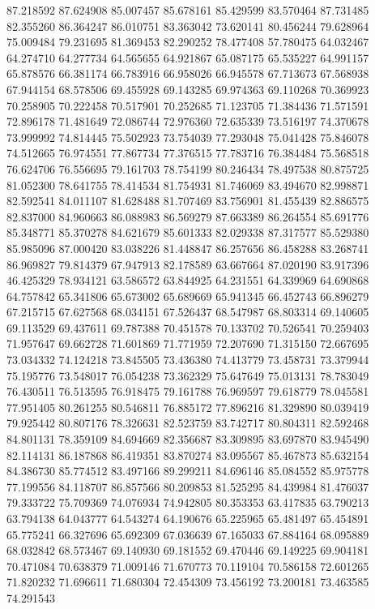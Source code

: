 87.218592
87.624908
85.007457
85.678161
85.429599
83.570464
87.731485
82.355260
86.364247
86.010751
83.363042
73.620141
80.456244
79.628964
75.009484
79.231695
81.369453
82.290252
78.477408
57.780475
64.032467
64.274710
64.277734
64.565655
64.921867
65.087175
65.535227
64.991157
65.878576
66.381174
66.783916
66.958026
66.945578
67.713673
67.568938
67.944154
68.578506
69.455928
69.143285
69.974363
69.110268
70.369923
70.258905
70.222458
70.517901
70.252685
71.123705
71.384436
71.571591
72.896178
71.481649
72.086744
72.976360
72.635339
73.516197
74.370678
73.999992
74.814445
75.502923
73.754039
77.293048
75.041428
75.846078
74.512665
76.974551
77.867734
77.376515
77.783716
76.384484
75.568518
76.624706
76.556695
79.161703
78.754199
80.246434
78.497538
80.875725
81.052300
78.641755
78.414534
81.754931
81.746069
83.494670
82.998871
82.592541
84.011107
81.628488
81.707469
83.756901
81.455439
82.886575
82.837000
84.960663
86.088983
86.569279
87.663389
86.264554
85.691776
85.348771
85.370278
84.621679
85.601333
82.029338
87.317577
85.529380
85.985096
87.000420
83.038226
81.448847
86.257656
86.458288
83.268741
86.969827
79.814379
67.947913
82.178589
63.667664
87.020190
83.917396
46.425329
78.934121
63.586572
63.844925
64.231551
64.339969
64.690868
64.757842
65.341806
65.673002
65.689669
65.941345
66.452743
66.896279
67.215715
67.627568
68.034151
67.526437
68.547987
68.803314
69.140605
69.113529
69.437611
69.787388
70.451578
70.133702
70.526541
70.259403
71.957647
69.662728
71.601869
71.771959
72.207690
71.315150
72.667695
73.034332
74.124218
73.845505
73.436380
74.413779
73.458731
73.379944
75.195776
73.548017
76.054238
73.362329
75.647649
75.013131
78.783049
76.430511
76.513595
76.918475
79.161788
76.969597
79.618779
78.045581
77.951405
80.261255
80.546811
76.885172
77.896216
81.329890
80.039419
79.925442
80.807176
78.326631
82.523759
83.742717
80.804311
82.592468
84.801131
78.359109
84.694669
82.356687
83.309895
83.697870
83.945490
82.114131
86.187868
86.419351
83.870274
83.095567
85.467873
85.632154
84.386730
85.774512
83.497166
89.299211
84.696146
85.084552
85.975778
77.199556
84.118707
86.857566
80.209853
81.525295
84.439984
81.476037
79.333722
75.709369
74.076934
74.942805
80.353353
63.417835
63.790213
63.794138
64.043777
64.543274
64.190676
65.225965
65.481497
65.454891
65.775241
66.327696
65.692309
67.036639
67.165033
67.884164
68.095889
68.032842
68.573467
69.140930
69.181552
69.470446
69.149225
69.904181
70.471084
70.638379
71.009146
71.670773
70.119104
70.586158
72.601265
71.820232
71.696611
71.680304
72.454309
73.456192
73.200181
73.463585
74.291543
